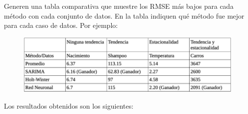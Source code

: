 \begin{problema}
	Generen una tabla comparativa que muestre los RMSE más bajos para cada método con cada conjunto de datos. En la tabla indiquen qué método fue mejor para cada caso de datos.  Por ejemplo:
	\begin{figure}[H]
		\centering
		\includegraphics[scale=0.5]{Images/1}
	\end{figure}
\begin{sol}
	Los resultados obtenidos son los siguientes: 
	\begin{table}[H]
		\caption{Comparación de RMSE}
		\label{tab:rmse}
	
	\end{table}
\end{sol}
\end{problema}

